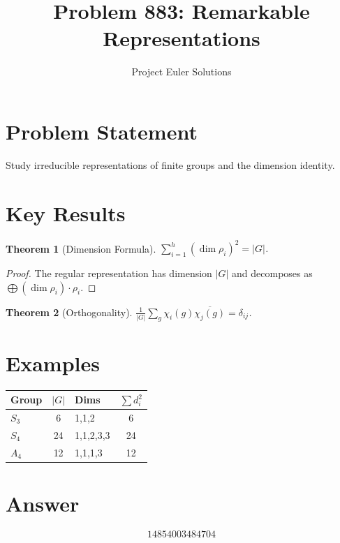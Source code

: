 \documentclass[11pt]{article}
\title{Problem 883: Remarkable Representations}
\author{Project Euler Solutions}
\date{}
\newtheorem{theorem}{Theorem}
\begin{document}
\maketitle

\section{Problem Statement}
Study irreducible representations of finite groups and the dimension identity.

\section{Key Results}

\begin{theorem}[Dimension Formula]
$\sum_{i=1}^{h} (\dim \rho_i)^2 = |G|$.
\end{theorem}

\begin{proof}
The regular representation has dimension $|G|$ and decomposes as $\bigoplus (\dim\rho_i)\cdot\rho_i$.
\end{proof}

\begin{theorem}[Orthogonality]
$\frac{1}{|G|}\sum_{g} \chi_i(g)\overline{\chi_j(g)} = \delta_{ij}$.
\end{theorem}

\section{Examples}
\begin{center}
\begin{tabular}{l|c|l|c}
Group & $|G|$ & Dims & $\sum d_i^2$ \\ \hline
$S_3$ & 6 & 1,1,2 & 6 \\
$S_4$ & 24 & 1,1,2,3,3 & 24 \\
$A_4$ & 12 & 1,1,1,3 & 12
\end{tabular}
\end{center}

\section{Answer}

\[
\boxed{14854003484704}
\]
\end{document}

